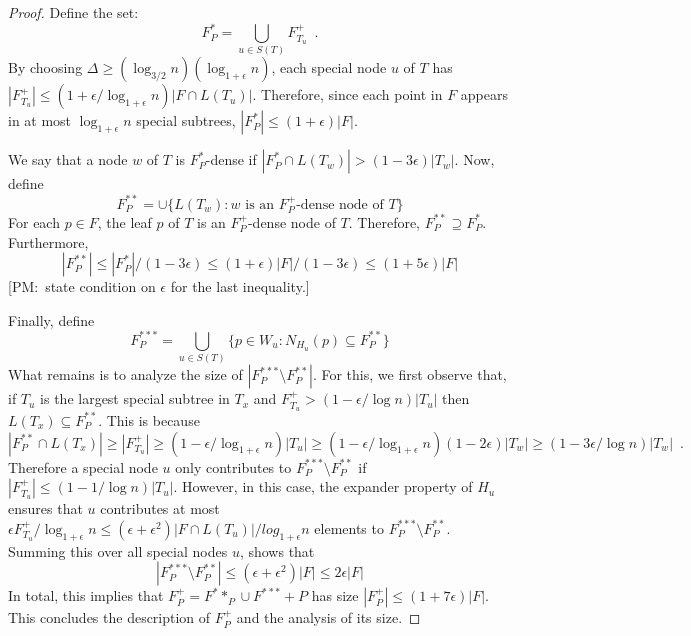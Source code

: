 \documentclass{patmorin}
\newcommand{\note}[2]{{\color{red}[#1:~#2]}}
\begin{document}
\begin{proof}
  Define the set:
  \[  
    F^*_P = \bigcup_{u\in S(T)} F^+_{T_u} \enspace .
  \]
  By choosing $\Delta \ge (\log_{3/2} n)(\log_{1+\epsilon}
  n)$, each special node $u$ of $T$ has $|F^+_{T_u}|\le
  (1+\epsilon/\log_{1+\epsilon} n)|F\cap L(T_u)|$. Therefore, since
  each point in $F$ appears in at most $\log_{1+\epsilon} n$ special
  subtrees, $|F^*_P|\le (1+\epsilon)|F|$.

  We say that a node $w$ of $T$ is $F^*_P$-dense if $|F^*_P \cap L(T_w)| >
  (1-3\epsilon)|T_w|$.  Now, define
  \[  
     F^{**}_P = \cup\{ L(T_w) : \text{$w$ is an $F^+_P$-dense node of $T$} \}
  \]
  For each $p\in F$, the leaf $p$ of $T$ is an $F^+_P$-dense node of
  $T$. Therefore, $F^{**}_P\supseteq F^{*}_P$.  Furthermore,
  \[
      |F^{**}_P| \le |F^*_P|/(1-3\epsilon) \le (1+\epsilon)|F|/(1-3\epsilon) \le (1+5\epsilon)|F|
  \]
  \note{PM}{state condition on $\epsilon$ for the last inequality.}

  Finally, define 
  \[  F^{***}_P = \bigcup_{u\in S(T)} \{p \in W_u : N_{H_u}(p)\subseteq F^{**}_P \} \]
  What remains is to analyze the size of $|F^{***}_P\setminus F^{**}_P|$.
  For this, we first observe that, if $T_u$ is the largest special
  subtree in $T_x$ and $F^+_{T_u} > (1-\epsilon/\log n)|T_u|$ then
  $L(T_x)\subseteq F^{**}_P$.  This is because
  \[
     |F^{**}_P\cap L(T_x)| 
  \ge  
     |F^+_{T_u}|
  \ge  
     (1-\epsilon/\log_{1+\epsilon} n)|T_u|
  \ge  
     (1-\epsilon/\log_{1+\epsilon} n)(1-2\epsilon)|T_w|
  \ge  
     (1-3\epsilon/\log n)|T_w| \enspace .
  \]
  Therefore a special node $u$ only contributes to $F^{***}_P\setminus
  F^{**}_P$ if $|F^+_{T_u}| \le (1-1/\log n)|T_u|$.  However,
  in this case, the expander property of $H_u$ ensures that $u$
  contributes at most $\epsilon F^+_{T_u}/\log_{1+\epsilon} n\le
  (\epsilon+\epsilon^2)|F\cap L(T_u)|/log_{1+\epsilon} n$ elements to
  $F^{***}_P\setminus F^{**}_P$.  Summing this over all special nodes $u$,
  shows that
  \[
     |F^{***}_P\setminus F^{**}_P| \le (\epsilon+\epsilon^2)|F| \le 2\epsilon|F|
  \]
  In total, this implies that $F^+_P = F^**_P\cup F^{***}+P$ has size
  $|F^+_P|\le (1+7\epsilon)|F|$.  This concludes the description of
  $F^+_P$ and the analysis of its size.


\end{proof}
\end{document}
